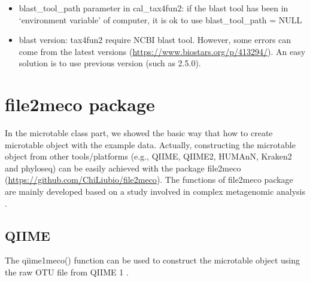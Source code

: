 \documentclass[
]{book}
\providecommand{\tightlist}{%
  \setlength{\itemsep}{0pt}\setlength{\parskip}{0pt}}
\begin{document}
\begin{itemize}
\tightlist
\item
  blast\_tool\_path parameter in cal\_tax4fun2: if the blast tool has been in `environment variable' of computer, it is ok to use blast\_tool\_path = NULL
\item
  blast version: tax4fun2 require NCBI blast tool. However, some errors can come from the latest versions (\url{https://www.biostars.org/p/413294/}). An easy solution is to use previous version (such as 2.5.0).
\end{itemize}

\hypertarget{file2meco-package}{%
\chapter{file2meco package}\label{file2meco-package}}

In the microtable class part, we showed the basic way that how to create microtable object with the example data.
Actually, constructing the microtable object from other tools/platforms (e.g., QIIME, QIIME2, HUMAnN, Kraken2 and phyloseq)
can be easily achieved with the package file2meco (\url{https://github.com/ChiLiubio/file2meco}).
The functions of file2meco package are mainly developed based on a study involved in complex metagenomic analysis \citep{Liu_Microbial_2022}.

\hypertarget{qiime}{%
\section{QIIME}\label{qiime}}

The qiime1meco() function can be used to construct the microtable object using the raw OTU file from QIIME 1 \citep{Caporaso_QIIME_2010}.
\end{document}
